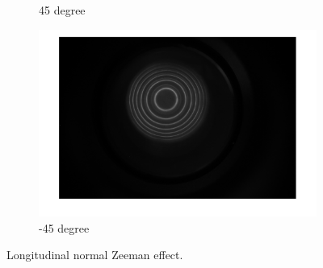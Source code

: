 \documentclass[a4paper,12pt]{article}
\begin{document}
\begin{figure}[H]
\begin{subfigure}[b]{0.3\textwidth}
            \caption{45 degree}
        \end{subfigure}
        \space
        \begin{subfigure}[b]{0.3\textwidth}
            \includegraphics[width=1.2\textwidth]{lon_nor_-45.png}
            \caption{-45 degree}
        \end{subfigure}
        \caption{Longitudinal normal Zeeman effect.}
        \label{fig:lon_nor}
    \end{figure}
    
\end{document}
